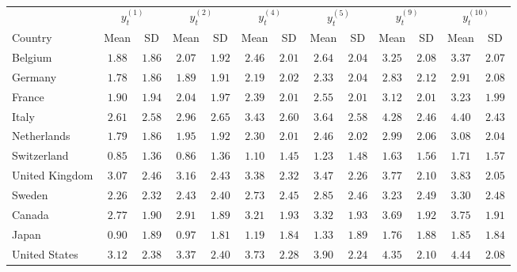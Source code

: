 \footnotesize
\setlength{\tabcolsep}{4pt}
\begin{tabular}{l cc cc cc cc cc cc}
  \toprule
  & \multicolumn{2}{c}{$y^{(1)}_t$} & \multicolumn{2}{c}{$y^{(2)}_t$}
  & \multicolumn{2}{c}{$y^{(4)}_t$} & \multicolumn{2}{c}{$y^{(5)}_t$}
  & \multicolumn{2}{c}{$y^{(9)}_t$} & \multicolumn{2}{c}{$y^{(10)}_t$} \\
  \cmidrule(lr){2-3}\cmidrule(lr){4-5}\cmidrule(lr){6-7}\cmidrule(lr){8-9}\cmidrule(lr){10-11}\cmidrule(lr){12-13}
  Country & Mean & SD & Mean & SD & Mean & SD & Mean & SD & Mean & SD & Mean & SD \\
  \midrule
  Belgium        & $1.88$ & $1.86$ & $2.07$ & $1.92$ & $2.46$ & $2.01$ & $2.64$ & $2.04$ & $3.25$ & $2.08$ & $3.37$ & $2.07$ \\
  Germany        & $1.78$ & $1.86$ & $1.89$ & $1.91$ & $2.19$ & $2.02$ & $2.33$ & $2.04$ & $2.83$ & $2.12$ & $2.91$ & $2.08$ \\
  France         & $1.90$ & $1.94$ & $2.04$ & $1.97$ & $2.39$ & $2.01$ & $2.55$ & $2.01$ & $3.12$ & $2.01$ & $3.23$ & $1.99$ \\
  Italy          & $2.61$ & $2.58$ & $2.96$ & $2.65$ & $3.43$ & $2.60$ & $3.64$ & $2.58$ & $4.28$ & $2.46$ & $4.40$ & $2.43$ \\
  Netherlands    & $1.79$ & $1.86$ & $1.95$ & $1.92$ & $2.30$ & $2.01$ & $2.46$ & $2.02$ & $2.99$ & $2.06$ & $3.08$ & $2.04$ \\
  Switzerland    & $0.85$ & $1.36$ & $0.86$ & $1.36$ & $1.10$ & $1.45$ & $1.23$ & $1.48$ & $1.63$ & $1.56$ & $1.71$ & $1.57$ \\
  United Kingdom & $3.07$ & $2.46$ & $3.16$ & $2.43$ & $3.38$ & $2.32$ & $3.47$ & $2.26$ & $3.77$ & $2.10$ & $3.83$ & $2.05$ \\
  Sweden         & $2.26$ & $2.32$ & $2.43$ & $2.40$ & $2.73$ & $2.45$ & $2.85$ & $2.46$ & $3.23$ & $2.49$ & $3.30$ & $2.48$ \\
  Canada         & $2.77$ & $1.90$ & $2.91$ & $1.89$ & $3.21$ & $1.93$ & $3.32$ & $1.93$ & $3.69$ & $1.92$ & $3.75$ & $1.91$ \\
  Japan          & $0.90$ & $1.89$ & $0.97$ & $1.81$ & $1.19$ & $1.84$ & $1.33$ & $1.89$ & $1.76$ & $1.88$ & $1.85$ & $1.84$ \\
  United States  & $3.12$ & $2.38$ & $3.37$ & $2.40$ & $3.73$ & $2.28$ & $3.90$ & $2.24$ & $4.35$ & $2.10$ & $4.44$ & $2.08$ \\
  \bottomrule
\end{tabular}
